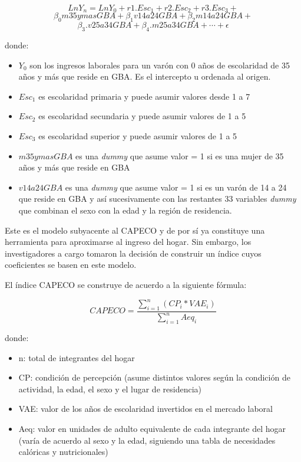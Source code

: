 $$Ln Y_n = Ln Y_0 + r1. Esc_1 + r2. Esc_2 + r3. Esc_3 + $$
$$ \beta_0 m35ymas GBA + \beta_1 v14a24 GBA+ \beta_2 m14a24GBA + $$
$$\beta_3. v25a34 GBA+ \beta_4. m25a34GBA + \cdots + \epsilon $$

donde:

\begin{itemize}
	\item $Y_0$ son los ingresos laborales para un varón con 0 años de escolaridad de 35 años y más que reside en GBA. Es el intercepto u ordenada al origen.
	\item $Esc_1$ es escolaridad primaria y puede asumir valores desde 1 a 7
	\item $Esc_2$ es escolaridad secundaria y puede asumir valores de 1 a 5
	\item $Esc_3$ es escolaridad superior y puede asumir valores de 1 a 5
	\item $m35ymasGBA$ es una \textit{dummy} que asume valor = 1 si es una mujer de 35 años y más que reside en GBA
	\item $v14a24GBA$ es una \textit{dummy} que asume valor = 1 si es un varón de 14 a 24 que reside en GBA y así sucesivamente con las restantes 33 variables \textit{dummy} que combinan el sexo con la edad y la región de residencia.
\end{itemize}

Este es el modelo subyacente al CAPECO y de por sí ya constituye una herramienta para aproximarse al ingreso del hogar. Sin embargo, los investigadores a cargo tomaron la decisión de construir un índice cuyos coeficientes se basen en este modelo. 

El índice CAPECO se construye de acuerdo a la siguiente fórmula:

$$ CAPECO = \frac{\displaystyle\sum_{i=1}^{n}(CP_i * VAE_i)}{\displaystyle\sum_{i=1}^{n}Aeq_i} $$

donde:
\begin{itemize}
	\item n: total de integrantes del hogar
	\item CP: condición de percepción (asume distintos valores según la condición de actividad, la edad, el sexo y el lugar de residencia)
	\item VAE: valor de los años de escolaridad invertidos en el mercado laboral
	\item Aeq: valor en unidades de adulto equivalente de cada integrante del hogar (varía de acuerdo al sexo y la edad, siguiendo una tabla de necesidades calóricas y nutricionales)
\end{itemize}


